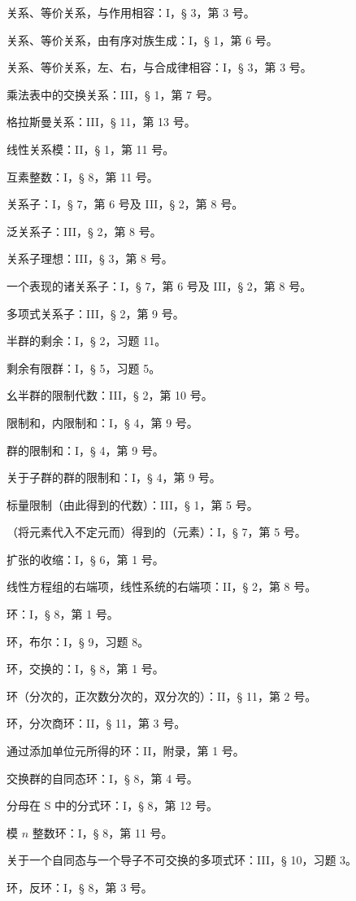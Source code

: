 关系、等价关系，与作用相容：I，§ 3，第 3 号。

关系、等价关系，由有序对族生成：I，§ 1，第 6 号。

关系、等价关系，左、右，与合成律相容：I，§ 3，第 3 号。

乘法表中的交换关系：III，§ 1，第 7 号。

格拉斯曼关系：III，§ 11，第 13 号。

线性关系模：II，§ 1，第 11 号。

互素整数：I，§ 8，第 11 号。

关系子：I，§ 7，第 6 号及 III，§ 2，第 8 号。

泛关系子：III，§ 2，第 8 号。

关系子理想：III，§ 3，第 8 号。

一个表现的诸关系子：I，§ 7，第 6 号及 III，§ 2，第 8 号。

多项式关系子：III，§ 2，第 9 号。

半群的剩余：I，§ 2，习题 11。

剩余有限群：I，§ 5，习题 5。

幺半群的限制代数：III，§ 2，第 10 号。

限制和，内限制和：I，§ 4，第 9 号。

群的限制和：I，§ 4，第 9 号。

关于子群的群的限制和：I，§ 4，第 9 号。

标量限制（由此得到的代数）：III，§ 1，第 5 号。

（将元素代入不定元而）得到的（元素）：I，§ 7，第 5 号。

扩张的收缩：I，§ 6，第 1 号。

线性方程组的右端项，线性系统的右端项：II，§ 2，第 8 号。

环：I，§ 8，第 1 号。

环，布尔：I，§ 9，习题 8。

环，交换的：I，§ 8，第 1 号。

环（分次的，正次数分次的，双分次的）：II，§ 11，第 2 号。

环，分次商环：II，§ 11，第 3 号。

通过添加单位元所得的环：II，附录，第 1 号。

交换群的自同态环：I，§ 8，第 4 号。

分母在 S 中的分式环：I，§ 8，第 12 号。

模 \(n\) 整数环：I，§ 8，第 11 号。

关于一个自同态与一个导子不可交换的多项式环：III，§ 10，习题 3。

环，反环：I，§ 8，第 3 号。


